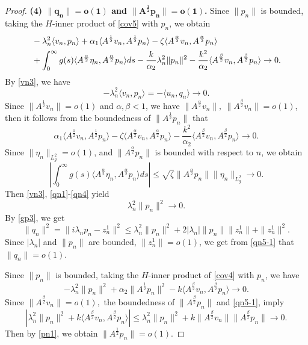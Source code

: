 \documentclass[12pt,reqno]{article}
\begin{document}
\begin{proof}
		{\bf \noindent(4) $\bm{\|q_n\|=o(1)}$ and $\bm{\|A^{\frac{1}{2}} p_n\|=o(1)}$.} Since $\|p_n\|$ is bounded, taking the $H$-inner product of \eqref{cov5} with $p_n$, we obtain
		\begin{align}\label{qn1}
			&-\lambda_n^2 \langle v_n, p_n \rangle
			+ \alpha_1 \langle A^{\frac{1}{2}} v_n, A^{\frac{1}{2}} p_n \rangle
			- \zeta \langle A^{\frac{\alpha}{2}} v_n, A^{\frac{\alpha}{2}} p_n \rangle \notag \\
			&+ \int_0^\infty g(s) \langle A^{\frac{\alpha}{2}} \eta_n, A^{\frac{\alpha}{2}} p_n \rangle ds
			- \frac{k}{\alpha_2} \lambda_n^2 \|p_n\|^2
			- \frac{k^2}{\alpha_2} \langle A^{\frac{\beta}{2}} v_n, A^{\frac{\beta}{2}} p_n \rangle
			\to 0.
		\end{align}
		By \eqref{vn3}, we have
		\begin{equation}\label{qn2}
			-\lambda_n^2 \langle v_n, p_n \rangle = -\langle u_n, q_n \rangle \to 0.
		\end{equation}
		Since $\| A^{\frac{1}{2}} v_n \|=o(1)$ and $\alpha,\beta<1$, we have $\| A^{\frac{\alpha}{2}} v_n \|,~\| A^{\frac{\beta}{2}} v_n \|=o(1)$, then it follows from the  boundedness of $\|A^{\frac{1}{2}} p_n\|$ that
		\begin{equation}\label{qn3}
			\alpha_1 \langle A^{\frac{1}{2}} v_n, A^{\frac{1}{2}} p_n \rangle
			- \zeta \langle A^{\frac{\alpha}{2}} v_n, A^{\frac{\alpha}{2}} p_n \rangle
			- \frac{k^2}{\alpha_2} \langle A^{\frac{\beta}{2}} v_n, A^{\frac{\beta}{2}} p_n \rangle
			\to 0.
		\end{equation}
		Since $\|\eta_n\|_{L_g^2}=o(1)$, and $\| A^{\frac{\alpha}{2}} p_n \|$ is bounded with respect to $n$, we obtain
		\begin{equation}\label{qn4}
			\left| \int_0^\infty g(s) \langle A^{\frac{\alpha}{2}} \eta_n, A^{\frac{\alpha}{2}} p_n \rangle ds \right| \leq \sqrt{\zeta} \|A^{\frac{\alpha}{2}} p_n\|\|\eta_n\|_{L_g^2} \to 0.
		\end{equation}
Then \eqref{vn3}, \eqref{qn1}-\eqref{qn4} yield
\begin{equation}\label{qn5-1}
		\lambda_n^2 \|p_n\|^2 \to 0.
		\end{equation}
By \eqref{gp3}, we get $$\|q_n\|^2=\|i\lambda_np_n-z_n^1\|^2\le\lambda_n^2\|p_n\|^2+2|\lambda_n|\|p_n\|\|z_n^1\|+\|z_n^1\|^2.$$
Since $|\lambda_n|$ and $\|p_n\|$ are bounded, $\|z_n^1\|=o(1)$, we get from \eqref{qn5-1} that $\|q_n\|=o(1)$.
		
Since $\|p_n\|$ is bounded, taking the $H$-inner product of \eqref{cov4} with $p_n$, we have
		\begin{equation}\label{pn1}
			-\lambda_n^2 \|p_n\|^2 + \alpha_2 \|A^{\frac{1}{2}}p_n\|^2 - k \langle A^{\frac{\beta}{2}}v_n, A^{\frac{\beta}{2}}p_n \rangle \to 0.
		\end{equation}
Since $\| A^{\frac{\beta}{2}} v_n \|=o(1),$ the boundedness of $\|A^{\frac{\beta}{2}} p_n\|$ and \eqref{qn5-1}, imply
$$\left|\lambda_n^2 \|p_n\|^2+k \langle A^{\frac{\beta}{2}}v_n, A^{\frac{\beta}{2}}p_n \rangle\right|\le\lambda_n^2 \|p_n\|^2+k\|A^{\frac{\beta}{2}}v_n\|\|A^{\frac{\beta}{2}}p_n\|\to0.$$
Then by \eqref{pn1}, we obtain $\|A^{\frac{1}{2}} p_n\|=o(1)$.
		

\end{proof}
\end{document}
